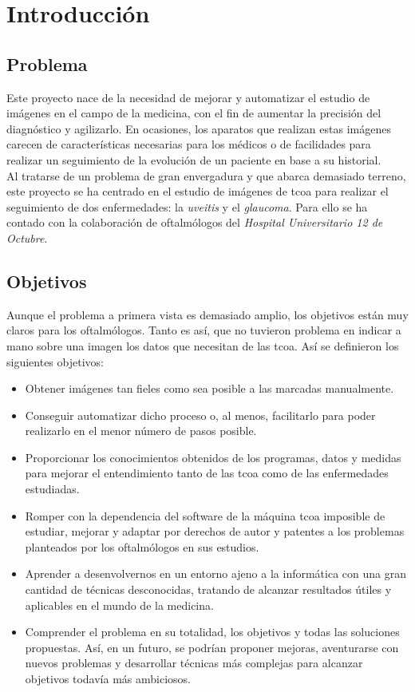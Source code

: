 \chapter{Introducción}
\section{Problema}
Este proyecto nace de la necesidad de mejorar y automatizar el estudio 
de imágenes en el campo de la medicina, con el fin de aumentar la precisión 
del diagnóstico y agilizarlo. En ocasiones, los aparatos que realizan 
estas imágenes carecen de características necesarias para los médicos 
o de facilidades para realizar un seguimiento de la evolución de un paciente 
en base a su historial. \\
Al tratarse de un problema de gran envergadura y que abarca demasiado
terreno, este proyecto se ha centrado en el estudio de imágenes de \gls{tcoa}
para realizar el seguimiento de dos enfermedades: la \emph{uveitis} y
el \emph{glaucoma}. Para ello se ha contado con la colaboración de
oftalmólogos del \emph{Hospital Universitario 12 de Octubre}.

\section{Objetivos}
Aunque el problema a primera vista es demasiado amplio,
los objetivos están muy claros para los oftalmólogos. Tanto es así, 
que no tuvieron problema en indicar a mano sobre una imagen los datos que 
necesitan de las \gls{tcoa}. Así se definieron los siguientes objetivos:
\begin{itemize}
\item Obtener imágenes tan fieles como sea posible a las marcadas
  manualmente.
\item Conseguir automatizar dicho proceso o, al menos,
  facilitarlo para poder realizarlo en el menor número de pasos posible.
\item Proporcionar los conocimientos obtenidos de los programas, datos y
  medidas para mejorar el entendimiento tanto de las \gls{tcoa}
  como de las enfermedades estudiadas.
\item Romper con la dependencia del software de la máquina \gls{tcoa}
  imposible de estudiar, mejorar y adaptar por derechos de autor y
  patentes a los problemas planteados por los oftalmólogos en sus
  estudios.
\item Aprender a desenvolvernos en un entorno ajeno a la informática
  con una gran cantidad de técnicas desconocidas, tratando de alcanzar
  resultados útiles y aplicables en el mundo de la medicina.
\item Comprender el problema en su totalidad, los objetivos y todas
  las soluciones propuestas. Así, en un futuro, se podrían proponer
  mejoras, aventurarse con nuevos problemas y desarrollar técnicas más
  complejas para alcanzar objetivos todavía más ambiciosos.
\end{itemize}
